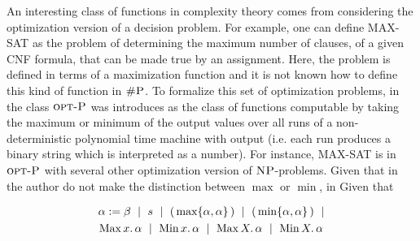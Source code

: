An interesting class of functions in complexity theory comes from considering the optimization version of a decision problem. For example, one can define MAX-SAT as the problem of determining the maximum number of clauses, of a given CNF formula, that can be made true by an assignment. Here, the problem is defined in terms of a maximization function and it is not known how to define this kind of function in $\text{\sc \#P}$. 
To formalize this set of optimization problems, in~\cite{krentel1988complexity} the class $\text{\sc opt-P}$ was introduces as the class of functions computable by taking the maximum or minimum of the output values over all runs of a non-deterministic polynomial time machine with output (i.e. each run produces a binary string which is interpreted as a number). 
For instance, MAX-SAT is in $\text{\sc opt-P}$ with several other optimization version of $\text{\sc NP}$-problems.
Given that in~\cite{krentel1988complexity} the author do not make the distinction between $\max$ or $\min$, in 
Given that 
 

\begin{multline}
\alpha := \beta \ \mid \ s \ \mid \ (\, \max\{\alpha,\alpha\} \,) \ \mid\ (\, \min\{\alpha,\alpha\} \,) \ \mid \\ \maxa{x} \alpha \ \mid \ \mina{x} \alpha \ \mid \ \maxa{X} \alpha \ \mid \ \mina{X} \alpha 
\end{multline}